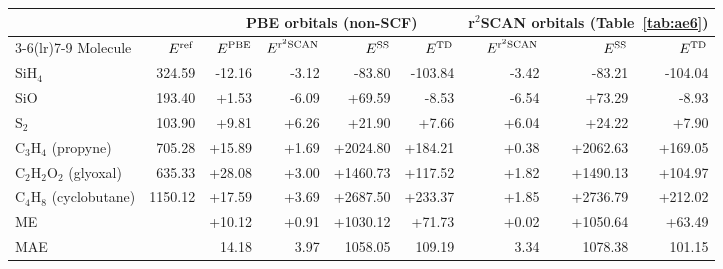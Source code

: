 \begin{tabular}{@{}l r rrrr rrr@{}}
\toprule
 & & \multicolumn{4}{c}{PBE orbitals (non-SCF)} & \multicolumn{3}{c}{r$^2$SCAN orbitals (Table~\ref{tab:ae6})} \\
\cmidrule(lr){3-6}\cmidrule(lr){7-9}
Molecule & $E^{\rm ref}$ & $E^{\rm PBE}$ & $E^{{\rm r}^2{\rm SCAN}}$ & $E^{\rm SS}$ & $E^{\rm TD}$ & $E^{{\rm r}^2{\rm SCAN}}$ & $E^{\rm SS}$ & $E^{\rm TD}$ \\
\midrule
SiH$_4$ & 324.59 & \textcolor{pyscfred}{-12.16} & \textcolor{pyscfred}{-3.12} & \textcolor{pyscfred}{-83.80} & \textcolor{pyscfred}{-103.84} & \textcolor{pyscfred}{-3.42} & \textcolor{pyscfred}{-83.21} & \textcolor{pyscfred}{-104.04} \\
SiO & 193.40 & \textcolor{pyscfred}{+1.53} & \textcolor{pyscfred}{-6.09} & \textcolor{pyscfred}{+69.59} & \textcolor{pyscfred}{-8.53} & \textcolor{pyscfred}{-6.54} & \textcolor{pyscfred}{+73.29} & \textcolor{pyscfred}{-8.93} \\
S$_2$ & 103.90 & \textcolor{pyscfred}{+9.81} & \textcolor{pyscfred}{+6.26} & \textcolor{pyscfred}{+21.90} & \textcolor{pyscfred}{+7.66} & \textcolor{pyscfred}{+6.04} & \textcolor{pyscfred}{+24.22} & \textcolor{pyscfred}{+7.90} \\
C$_3$H$_4$ (propyne) & 705.28 & \textcolor{pyscfred}{+15.89} & \textcolor{pyscfred}{+1.69} & \textcolor{pyscfred}{+2024.80} & \textcolor{pyscfred}{+184.21} & \textcolor{pyscfred}{+0.38} & \textcolor{pyscfred}{+2062.63} & \textcolor{pyscfred}{+169.05} \\
C$_2$H$_2$O$_2$ (glyoxal) & 635.33 & \textcolor{pyscfred}{+28.08} & \textcolor{pyscfred}{+3.00} & \textcolor{pyscfred}{+1460.73} & \textcolor{pyscfred}{+117.52} & \textcolor{pyscfred}{+1.82} & \textcolor{pyscfred}{+1490.13} & \textcolor{pyscfred}{+104.97} \\
C$_4$H$_8$ (cyclobutane) & 1150.12 & \textcolor{pyscfred}{+17.59} & \textcolor{pyscfred}{+3.69} & \textcolor{pyscfred}{+2687.50} & \textcolor{pyscfred}{+233.37} & \textcolor{pyscfred}{+1.85} & \textcolor{pyscfred}{+2736.79} & \textcolor{pyscfred}{+212.02} \\
\midrule
ME & & \textcolor{pyscfred}{+10.12} & \textcolor{pyscfred}{+0.91} & \textcolor{pyscfred}{+1030.12} & \textcolor{pyscfred}{+71.73} & \textcolor{pyscfred}{+0.02} & \textcolor{pyscfred}{+1050.64} & \textcolor{pyscfred}{+63.49} \\
MAE & & \textcolor{pyscfred}{14.18} & \textcolor{pyscfred}{3.97} & \textcolor{pyscfred}{1058.05} & \textcolor{pyscfred}{109.19} & \textcolor{pyscfred}{3.34} & \textcolor{pyscfred}{1078.38} & \textcolor{pyscfred}{101.15} \\
\bottomrule
\end{tabular}

